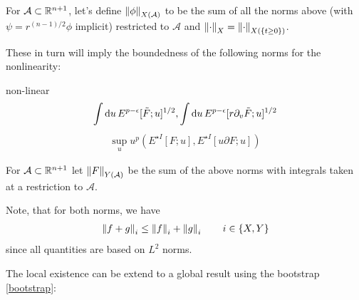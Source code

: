 \documentclass[11pt, oneside]{amsart}
\begin{document}
	\begin{definition}\label{x norm definition}
		For $\mathcal{A}\subset \mathbb{R}^{n+1}$, let's define $\left\lVert \phi\right\rVert_{X(\mathcal{A})}$ to be the sum of all the norms above (with $\psi=r^{(n-1)/2}\phi$ implicit) restricted to $\mathcal{A}$ and $\left\lVert \cdot\right\rVert_{X}=\left\lVert \cdot\right\rVert_{X(\{t\geq0\})}$. 
	\end{definition}
	These in turn will imply the boundedness of the following norms for the nonlinearity:
	
	\begin{taggedsubequations}{non-linear}\label{nonlinear bootstrap}
		\begin{equation}\label{key}
			\begin{gathered}
				\int \mathrm{d} u\,E^{p-\epsilon}[\tilde{F};u]^{1/2},\int \mathrm{d} u\,E^{p-\epsilon}[r\partial_v \tilde{F};u]^{1/2}
			\end{gathered}
		\end{equation}
		\begin{equation}\label{key}
			\begin{gathered}
				\sup_u u^{p}(E^{\star I}[F;u],E^{\star I}[u\partial F;u])
			\end{gathered}
		\end{equation}
		
\end{taggedsubequations}
	\begin{definition}\label{y norm definition}
		For $\mathcal{A}\subset\mathbb{R}^{n+1}$ let $\left\lVert F\right\rVert_{Y(\mathcal{A})}$ be the sum of the above norms with integrals taken at a restriction to $\mathcal{A}$.
	\end{definition}
	\begin{remark}
		Note, that for both norms, we have
		\begin{equation*}
			\begin{gathered}
				\left\lVert f+g\right\rVert_i\leq\left\lVert f\right\rVert_i+\left\lVert g\right\rVert_i\qquad i\in\{X,Y\}
			\end{gathered}
		\end{equation*}
	since all quantities are based on $L^2$ norms.
	\end{remark} 
	
	The local existence can be extend to a global result using the bootstrap  \cref{bootstrap}:
	
\end{document}
